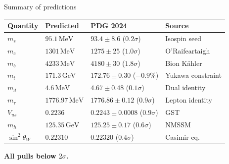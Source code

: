 \documentclass[aspectratio=169,12pt]{beamer}
\newcommand{\MeV}{\,\text{MeV}}
\newcommand{\GeV}{\,\text{GeV}}
\begin{document}
\begin{frame}{Summary of predictions}

\small
\begin{center}
\begin{tabular}{llll}
\toprule
Quantity & Predicted & PDG 2024 & Source \\
\midrule
$m_s$ & $95.1\MeV$ & $93.4 \pm 8.6$ ($0.2\sigma$)
  & Isospin seed \\
$m_c$ & $1301\MeV$ & $1275 \pm 25$ ($1.0\sigma$)
  & O'Raifeartaigh \\
$m_b$ & $4233\MeV$ & $4180 \pm 30$ ($1.8\sigma$)
  & Bion K\"ahler \\
$m_t$ & $171.3\GeV$ & $172.76 \pm 0.30$ ($-0.9\%$)
  & Yukawa constraint \\
$m_d$ & $4.6\MeV$ & $4.67 \pm 0.48$ ($0.1\sigma$)
  & Dual identity \\
$m_\tau$ & $1776.97\MeV$ & $1776.86 \pm 0.12$ ($0.9\sigma$)
  & Lepton identity \\
$V_{us}$ & $0.2236$ & $0.2243 \pm 0.0008$ ($0.9\sigma$)
  & GST \\
$m_h$ & $125.35\GeV$ & $125.25 \pm 0.17$ ($0.6\sigma$)
  & NMSSM \\
$\sin^2\theta_W$ & $0.22310$ & $0.22320$ ($0.4\sigma$)
  & Casimir eq. \\
\bottomrule
\end{tabular}
\end{center}

\textbf{All pulls below $2\sigma$.}

\end{frame}
\end{document}
